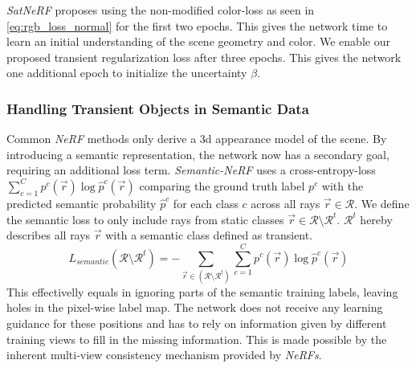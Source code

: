 \emph{SatNeRF} \cite{satnerf} proposes using the non-modified color-loss as seen in \cref{eq:rgb_loss_normal} for the first two epochs. This gives the network time to learn an initial understanding of the scene geometry and color. We enable our proposed transient regularization loss after three epochs. 
This gives the network one additional epoch to initialize the uncertainty $\beta$.

\subsubsection{Handling Transient Objects in Semantic Data}
\label{subsubsec:transients_semantic}

Common \emph{NeRF} methods only derive a 3d appearance model of the scene. By introducing a semantic representation, the network now has a secondary goal, requiring an additional loss term.
\emph{Semantic-NeRF} \cite{semanticnerf} uses a cross-entropy-loss $\sum_{c=1}^{C} p^c(\vec{r}) \log{\hat{p}^c(\vec{r})}$ comparing the ground truth label $p^c$ with the predicted semantic probability $\hat{p}^c$ for each class $c$ across all rays $\vec{r} \in \mathcal{R}$.
We define the semantic loss to only include rays from static classes $\vec{r} \in \mathcal{R} \setminus \mathcal{R}^t$. $\mathcal{R}^t$ hereby describes all rays $\vec{r}$ with a semantic class defined as transient. 
\begin{equation}
	L_{semantic}(\mathcal{R} \setminus \mathcal{R}^t) = - \sum_{\vec{r} \in (\mathcal{R} \setminus \mathcal{R}^t )} \sum_{c=1}^{C} p^c(\vec{r}) \log{\hat{p}^c(\vec{r})}
	\label{eq:loss_semantic_modified}
\end{equation}
This effectivelly equals in ignoring parts of the semantic training labels, leaving holes in the pixel-wise label map. The network does not receive any learning guidance for these positions and has to rely on information given by different training views to fill in the missing information. This is made possible by the inherent multi-view consistency mechanism provided by \emph{NeRFs}.









